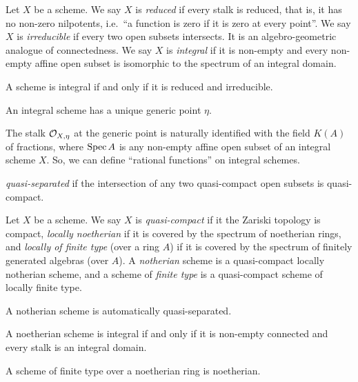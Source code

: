 \documentclass{../../large}
\begin{document}
\begin{prb}
Let $X$ be a scheme.
We say $X$ is \emph{reduced} if every stalk is reduced, that is, it has no non-zero nilpotents, i.e.~``a function is zero if it is zero at every point''.
We say $X$ is \emph{irreducible} if every two open subsets intersects.
It is an algebro-geometric analogue of connectedness.
We say $X$ is \emph{integral} if it is non-empty and every non-empty affine open subset is isomorphic to the spectrum of an integral domain.
\begin{parts}
\item A scheme is integral if and only if it is reduced and irreducible.
\item An integral scheme has a unique generic point $\eta$.
\item The stalk $\mathcal{O}_{X,\eta}$ at the generic point is naturally identified with the field $K(A)$ of fractions, where $\operatorname{Spec} A$ is any non-empty affine open subset of an integral scheme $X$. So, we can define ``rational functions'' on integral schemes.
\end{parts}
\end{prb}

\begin{prb}
\emph{quasi-separated} if the intersection of any two quasi-compact open subsets is quasi-compact.
\end{prb}


\begin{prb}
Let $X$ be a scheme.
We say $X$ is \emph{quasi-compact} if it the Zariski topology is compact, \emph{locally noetherian} if it is covered by the spectrum of noetherian rings, and \emph{locally of finite type} (over a ring $A$) if it is covered by the spectrum of finitely generated algebras (over $A$).
A \emph{notherian} scheme is a quasi-compact locally notherian scheme, and a scheme of \emph{finite type} is a quasi-compact scheme of locally finite type.
\begin{parts}
\item A notherian scheme is automatically quasi-separated.
\item A noetherian scheme is integral if and only if it is non-empty connected and every stalk is an integral domain.
\item A scheme of finite type over a noetherian ring is noetherian.
\end{parts}
\end{prb}


\begin{prb}
\end{prb}
\end{document}
